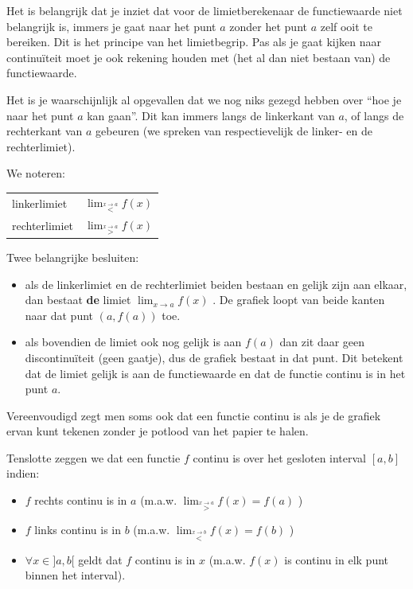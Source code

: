 Het is belangrijk dat je inziet dat voor de limietberekenaar
de functiewaarde niet belangrijk is, immers je gaat naar het punt
$a$ zonder het punt $a$ zelf ooit te bereiken. Dit is het principe
van het limietbegrip. Pas als je gaat kijken naar continu\"iteit moet
je ook rekening houden met (het al dan niet bestaan van) de functiewaarde.


Het is je waarschijnlijk al opgevallen dat we nog niks gezegd
hebben over ``hoe je naar het punt $a$ kan gaan''. Dit kan immers
langs de linkerkant van $a$, of langs de rechterkant van $a$ gebeuren
(we spreken van respectievelijk de linker- en de rechterlimiet).


\begin{notatie}
	We noteren: %
\begin{tabular}{l|l}
linkerlimiet & $\lim_{\overset{x\rightarrow a}{<}}f(x)$\\
rechterlimiet & $\lim_{\overset{x\rightarrow a}{>}}f(x)$\\
\end{tabular}
\end{notatie}

\begin{ftonthoud}
	Twee belangrijke besluiten:
\begin{itemize}
\item als de linkerlimiet en de rechterlimiet beiden bestaan en gelijk zijn
aan elkaar, dan bestaat \textbf{de} limiet $\lim_{x\to a}f(x)$
. De grafiek loopt van beide kanten naar dat punt $(a,f(a))$ toe.
\item als bovendien de limiet ook nog gelijk is aan $f(a)$ dan zit daar
geen discontinu\"iteit (geen gaatje), dus de grafiek bestaat in dat
punt. Dit betekent dat de limiet gelijk is aan de functiewaarde en
dat de functie continu is in het punt $a$.
\end{itemize}
Vereenvoudigd zegt men soms ook dat een functie continu
is als je de grafiek ervan kunt tekenen zonder je potlood van het
papier te halen.
\end{ftonthoud}


Tenslotte zeggen we dat een functie $f$ continu is over
het gesloten interval $[a,b]$ indien:
\begin{itemize}
\item $f$ rechts continu is in $a$ (m.a.w. $\lim_{\overset{x\rightarrow a}{>}}f(x)=f(a)$
)
\item $f$ links continu is in $b$ (m.a.w. $\lim_{\overset{x\rightarrow b}{<}}f(x)=f(b)$
)
\item $\forall x\in]a,b[$ geldt dat $f$ continu is in $x$ (m.a.w. $f(x)$
is continu in elk punt binnen het interval).
\end{itemize}



